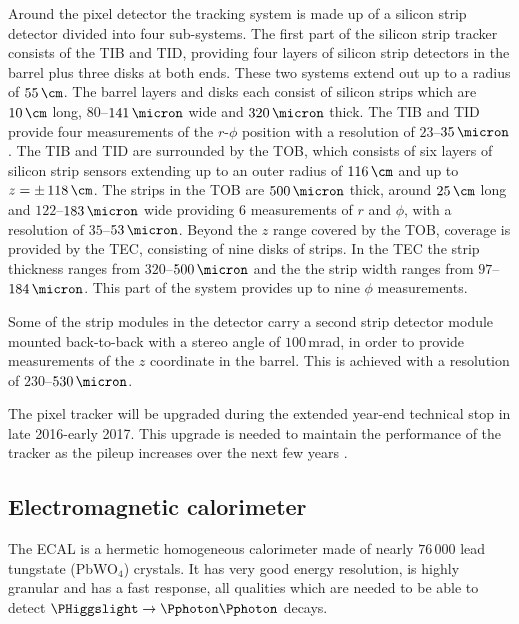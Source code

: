 Around the pixel detector the tracking system is made up of a silicon
strip detector divided into four sub-systems. The first part of the
silicon strip tracker consists of the \ac{TIB} and \ac{TID}, providing four layers of
silicon strip detectors in the barrel plus three disks at both ends. These two systems
extend out up to a radius of $55\,\cm$. The barrel layers and disks each consist
of silicon strips which are $10\,\cm$ long, $80$--$141\,\micron$ wide and $320\,\micron$ thick. The \ac{TIB} and \ac{TID}
provide four measurements of the $r$-$\phi$ position with a resolution of $23$--$35\,\micron$. 
The \ac{TIB} and \ac{TID} are surrounded by the \ac{TOB}, which consists of six layers of silicon strip sensors extending
up to an outer radius of $116\,\cm$ and up to $z=\pm\,118\,\cm$. The strips in the \ac{TOB} are $500\,\micron$ thick, 
around $25\,\cm$ long and $122$--$183\,\micron$ 
wide providing 6 measurements of $r$ and $\phi$, with a resolution
of $35$--$53\,\micron$. Beyond the $z$ range covered by the \ac{TOB}, coverage is provided by the \ac{TEC},
consisting of nine disks of strips. In the \ac{TEC} the strip thickness ranges from $320$--$500\,\micron$ and 
the the strip width ranges from $97$--$184\,\micron$. %
This part of the system provides up to nine $\phi$ measurements.

Some of the strip modules in the detector carry a second strip detector module mounted back-to-back with a stereo angle %
of $100\,$mrad, in order to provide measurements of the $z$ coordinate in the barrel. This is achieved with a resolution of $230$--$530\,\micron$.

The pixel tracker will be upgraded during the extended year-end technical stop in late 2016-early 2017. This upgrade is needed to
maintain the performance of the tracker as the pileup increases over the next few years \cite{cms-pixel-upgrade}. %

\subsection{Electromagnetic calorimeter}
\label{sec:CMSLHC_CMS_ecal}
The \ac{ECAL} \cite{cms-jinst} is a hermetic homogeneous calorimeter
made of nearly $76\,000$ lead tungstate (PbWO$_4$) crystals. It has very
good energy resolution, is highly granular and has a fast response, all qualities 
which are needed to be able to detect $\PHiggslight\rightarrow \Pphoton\Pphoton$ decays.

